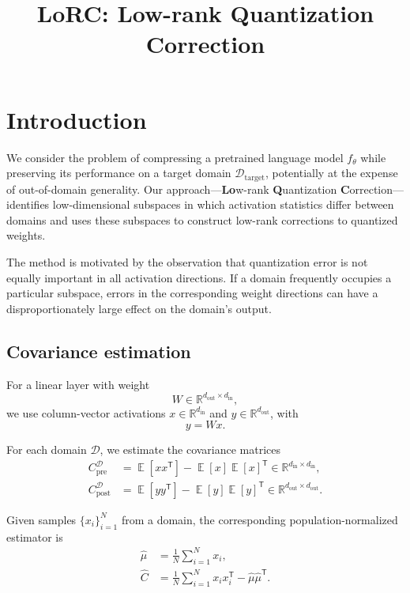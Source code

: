 \documentclass[11pt,a4paper]{article}
\title{LoRC: Low-rank Quantization Correction}
\date{}
\DeclareMathOperator{\E}{\mathbb{E}}
\begin{document}
\maketitle

\section{Introduction}

We consider the problem of compressing a pretrained language model
$f_\theta$ while preserving its performance on a target domain
$\mathcal{D}_{\mathrm{target}}$, potentially at the expense of
out-of-domain generality. Our approach---\textbf{Lo}w-rank
\textbf{Q}uantization \textbf{C}orrection---identifies low-dimensional
subspaces in which activation statistics differ between domains and
uses these subspaces to construct low-rank corrections to quantized
weights.

The method is motivated by the observation that quantization error is
not equally important in all activation directions. If a domain
frequently occupies a particular subspace, errors in the corresponding
weight directions can have a disproportionately large effect on the
domain's output.

\subsection{Covariance estimation}

For a linear layer with weight
\[
W \in \mathbb{R}^{d_{\mathrm{out}} \times d_{\mathrm{in}}},
\]
we use column-vector activations
$x \in \mathbb{R}^{d_{\mathrm{in}}}$ and
$y \in \mathbb{R}^{d_{\mathrm{out}}}$, with
\[
y = Wx.
\]

For each domain $\mathcal{D}$, we estimate the covariance matrices
\begin{align}
C_{\mathrm{pre}}^{\mathcal{D}}
&=
\E[xx^{\mathsf T}]
-
\E[x]\E[x]^{\mathsf T}
\in
\mathbb{R}^{d_{\mathrm{in}}\times d_{\mathrm{in}}},
\\
C_{\mathrm{post}}^{\mathcal{D}}
&=
\E[yy^{\mathsf T}]
-
\E[y]\E[y]^{\mathsf T}
\in
\mathbb{R}^{d_{\mathrm{out}}\times d_{\mathrm{out}}}.
\end{align}

Given samples $\{x_i\}_{i=1}^N$ from a domain, the corresponding
population-normalized estimator is
\begin{align}
\widehat{\mu}
&=
\frac{1}{N}\sum_{i=1}^N x_i,
\\
\widehat{C}
&=
\frac{1}{N}\sum_{i=1}^N x_i x_i^{\mathsf T}
-
\widehat{\mu}\widehat{\mu}^{\mathsf T}.
\end{align}
\end{document}
